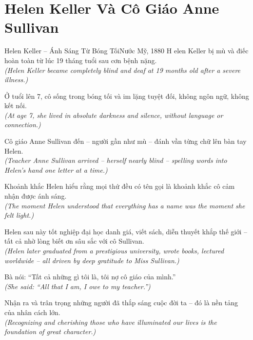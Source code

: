 \section{Helen Keller Và Cô Giáo Anne Sullivan}
\begin{truyen}{Helen Keller -- Ánh Sáng Từ Bóng Tối}{Nước Mỹ, 1880}
H elen Keller bị mù và điếc hoàn toàn từ lúc 19 tháng tuổi sau cơn bệnh nặng.\\
\textit{(Helen Keller became completely blind and deaf at 19 months old after a severe illness.)}

Ở tuổi lên 7, cô sống trong bóng tối và im lặng tuyệt đối, không ngôn ngữ, không kết nối.\\
\textit{(At age 7, she lived in absolute darkness and silence, without language or connection.)}

Cô giáo Anne Sullivan đến -- người gần như mù -- đánh vần từng chữ lên bàn tay Helen.\\
\textit{(Teacher Anne Sullivan arrived -- herself nearly blind -- spelling words into Helen's hand one letter at a time.)}

Khoảnh khắc Helen hiểu rằng mọi thứ đều có tên gọi là khoảnh khắc cô cảm nhận được ánh sáng.\\
\textit{(The moment Helen understood that everything has a name was the moment she felt light.)}

Helen sau này tốt nghiệp đại học danh giá, viết sách, diễn thuyết khắp thế giới -- tất cả nhờ lòng biết ơn sâu sắc với cô Sullivan.\\
\textit{(Helen later graduated from a prestigious university, wrote books, lectured worldwide -- all driven by deep gratitude to Miss Sullivan.)}

Bà nói: ``Tất cả những gì tôi là, tôi nợ cô giáo của mình.''\\
\textit{(She said: ``All that I am, I owe to my teacher.'')}

\end{truyen}
\begin{baihoc}
  Nhận ra và trân trọng những người đã thắp sáng cuộc đời ta -- đó là nền tảng của nhân cách lớn.\\
  \textit{(Recognizing and cherishing those who have illuminated our lives is the foundation of great character.)}
\end{baihoc}

